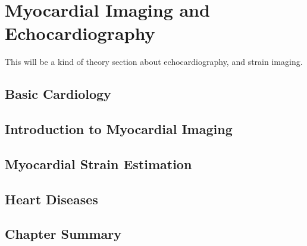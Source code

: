 \chapter{Myocardial Imaging and Echocardiography} \label{chap:strain}
\begin{comment}
[ ] Short about cardiology and echocardiography history
[ ] Short about the heart, and its anatomy
[ ] Even shorter about ultrasound, the different views, and what parts of the heart can be seen in them.
[ ] Method for extracting strain curves from ultrasound videos.
[ ] Explain the different diagnosises that will be encountered in this thesis.
[ ] Explain anatomical reasoning for why symptoms for certain diagnosis are evident in strain curves.
[ ] Summarize chapter
\end{comment}

This will be a kind of theory section about echocardiography, and strain imaging. \bigskip

\section{Basic Cardiology}

\section{Introduction to Myocardial Imaging}

\section{Myocardial Strain Estimation}

\section{Heart Diseases}

\section{Chapter Summary}
